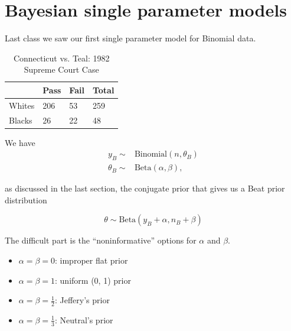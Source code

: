 \section{Bayesian single parameter models}

Last class we saw our first single parameter model for Binomial data.

\begin{table}[ht]
\centering
\begin{tabular}{@{}llll@{}}
\toprule
       & Pass & Fail & Total \\ \midrule
Whites & 206  & 53   & 259   \\
Blacks & 26   & 22   & 48    \\ \bottomrule
\end{tabular}
\caption{Connecticut vs. Teal: 1982 Supreme Court Case}
\end{table}

We have
\begin{align*}
    y_B \sim& \text{Binomial}(n, \theta_B)\\
    \theta_B \sim& \text{Beta}(\alpha, \beta),
\end{align*}

as discussed in the last section, the conjugate prior that gives us a Beat prior distribution 

\[
\theta \sim \text{Beta}(y_B + \alpha, n_B + \beta)
\]

The difficult part is the ``noninformative'' options for $\alpha$ and $\beta$.

\begin{itemize}
    \item $\alpha = \beta = 0$: improper flat prior
    \item $\alpha = \beta = 1$: uniform (0, 1) prior
    \item $\alpha = \beta = \frac{1}{2}$: Jeffery's prior
    \item $\alpha = \beta = \frac{1}{3}$: Neutral's prior
\end{itemize}

